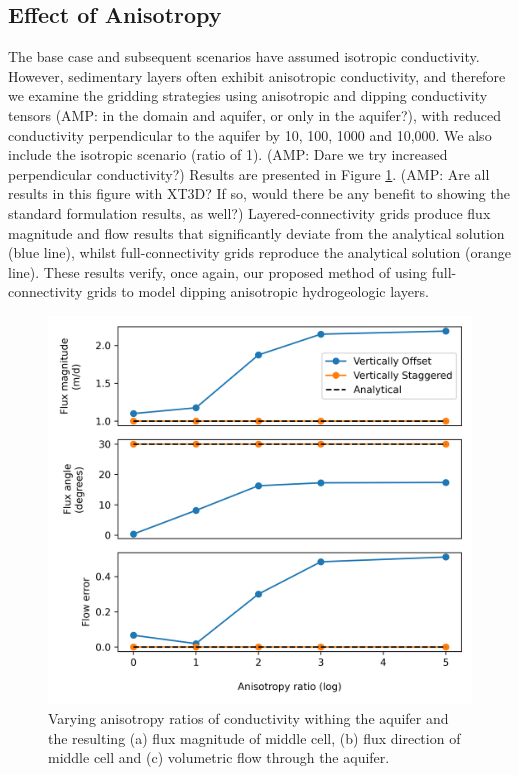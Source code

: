 \documentclass{article}
\begin{document}
\subsection{Effect of Anisotropy}

The base case and subsequent scenarios have assumed isotropic conductivity. However, sedimentary layers often exhibit anisotropic conductivity, and therefore we examine the gridding strategies using anisotropic and dipping conductivity tensors {\color{red} (AMP: in the domain and aquifer, or only in the aquifer?)}, with reduced conductivity perpendicular to the aquifer by 10, 100, 1000 and 10,000. We also include the isotropic scenario (ratio of 1). {\color{red} (AMP: Dare we try increased perpendicular conductivity?)} Results are presented in Figure \ref{fig:fig5}. {\color{red} (AMP: Are all results in this figure with XT3D? If so, would there be any benefit to showing the standard formulation results, as well?)} Layered-connectivity grids produce flux magnitude and flow results that significantly deviate from the analytical solution (blue line), whilst full-connectivity grids reproduce the analytical solution (orange line). These results verify, once again, our proposed method of using full-connectivity grids to model dipping anisotropic hydrogeologic layers.


\begin{figure}
	\begin{center}
	\includegraphics[scale=0.9]{../figures/fig5paper.png}
	\caption{Varying anisotropy ratios of conductivity withing the aquifer and the resulting (a) flux magnitude of middle cell, (b) flux direction of middle cell and (c) volumetric flow through the aquifer. }
	\label{fig:fig5}
	\end{center}
\end{figure}
\end{document}
